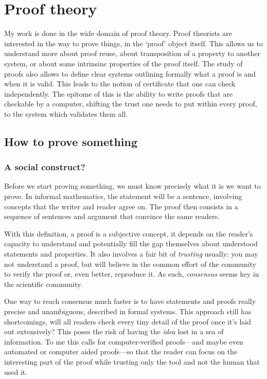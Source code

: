 \chapter{Proof theory}

My work is done in the wide domain of proof theory. Proof theorists are
interested in the way to prove things, in the `proof' object itself.
This allows us to understand more about proof reuse, about transposition of a
property to another system, or about some intrinsinc properties of the proof
itself. The study of proofs also allows to define clear systems outlining
formally what a proof is and when it is valid. This leads to the notion of
certificate that one can check independently. The epitome of this is the ability
to write proofs that are checkable by a computer, shifting the trust one needs
to put within every proof, to the system which validates them all.

\section{How to prove something}

\subsection{A social construct?}

Before we start proving something, we must know precisely what it is we want to
prove. In informal mathematics, the statement will be a sentence, involving
concepts that the writer and reader agree on. The proof then consists in a
sequence of sentences and argument that convince the same readers.

With this definition, a proof is a subjective concept, it depends on the
reader's capacity to understand and potentially fill the gap themselves about
understood statements and properties. It also involves a fair bit of
\emph{trusting} usually: you may not understand a proof, but will believe in
the common effort of the community to verify the proof or, even better,
reproduce it.
As such, \emph{consensus} seems key in the scientific community.

One way to reach consensus much faster is to have statements and proofs really
precise and unambiguous, described in formal systems. This approach still has
shortcomings, will all readers check every tiny detail of the proof once it's
laid out extensively? This poses the risk of having the \emph{idea} lost in a
sea of information.
To me this calls for computer-verified proofs---and maybe even automated or
computer aided proofs---so that the reader can focus on the interesting part of
the proof while trusting only the tool and not the human that used it.


